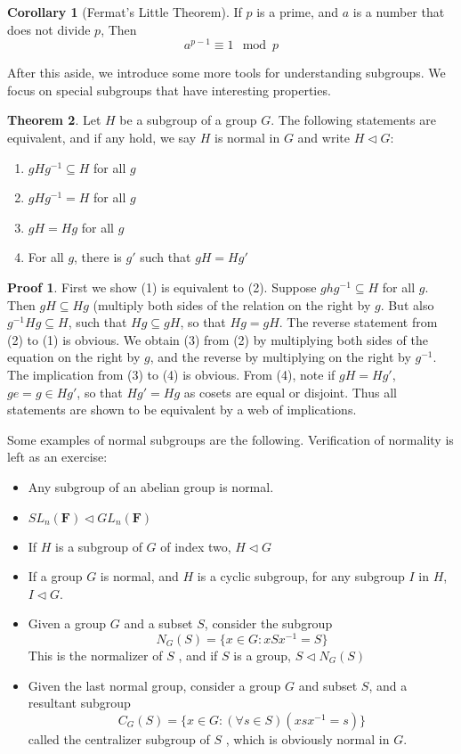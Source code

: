 \documentclass[12pt]{amsbook}
\theoremstyle{definition}
\newtheorem{theorem}{Theorem}[chapter]
\newtheorem{corollary}[theorem]{Corollary}
\newtheorem*{prf}{Proof}
\begin{document}
\begin{corollary}[Fermat's Little Theorem] 
    If $p$ is a prime, and $a$ is a number that does not divide $p$, Then
    \[ a^{p-1} \equiv 1 \mod{p} \]
\end{corollary}

After this aside, we introduce some more tools for understanding subgroups. We focus on special subgroups that have interesting properties.

\begin{theorem}
Let $H$ be a subgroup of a group $G$. The following statements are equivalent, and if any hold, we say $H$ is normal in $G$  and write $H \lhd G$:
\begin{enumerate}
    \item $gHg^{-1} \subseteq H$ for all $g$
    \item $gHg^{-1} = H$ for all $g$
    \item $gH = Hg$ for all $g$
    \item For all $g$, there is $g'$ such that $gH = Hg'$
\end{enumerate}
\end{theorem}
\begin{prf}
    First we show (1) is equivalent to (2). Suppose $ghg^{-1} \subseteq H$ for all $g$. Then $gH \subseteq Hg$ (multiply both sides of the relation on the right by $g$. But also $g^{-1}Hg \subseteq H$, such that $Hg \subseteq gH$, so that $Hg = gH$. The reverse statement from (2) to (1) is obvious. We obtain (3) from (2) by multiplying both sides of the equation on the right by $g$, and the reverse by multiplying on the right by $g^{-1}$. The implication from (3) to (4) is obvious. From (4), note if $gH = Hg'$, $ge = g \in Hg'$, so that $Hg' = Hg$ as cosets are equal or disjoint. Thus all statements are shown to be equivalent by a web of implications.
\end{prf}

Some examples of normal subgroups are the following. Verification of normality is left as an exercise:
\begin{itemize}
    \item Any subgroup of an abelian group is normal.
    \item $SL_n(\mathbf{F}) \lhd GL_n(\mathbf{F})$
    \item If $H$ is a subgroup of $G$ of index two, $H \lhd G$
    \item If a group $G$ is normal, and $H$ is a cyclic subgroup, for any subgroup $I$ in $H$, $I \lhd G$.
    \item Given a group $G$ and a subset $S$, consider the subgroup
    \[ N_G(S) = \{ x \in G : xSx^{-1} = S \} \]
    This is the normalizer of $S$ , and if $S$ is a group, $S \lhd N_G(S)$
    \item Given the last normal group, consider a group $G$ and subset $S$, and a resultant subgroup
    \[ C_G(S) = \{ x \in G : (\forall s \in S)(xsx^{-1} = s) \} \]
    called the centralizer subgroup of $S$ , which is obviously normal in $G$.
\end{itemize}
\end{document}
